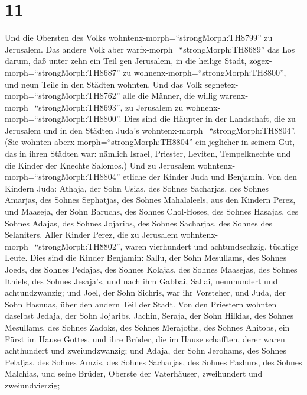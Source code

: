 \hypertarget{section-10}{%
\section{11}\label{section-10}}

 Und die Obersten des Volks
wohntenx-morph=``strongMorph:TH8799'' zu Jerusalem. Das andere Volk aber
warfx-morph=``strongMorph:TH8689'' das Los darum, daß unter zehn ein
Teil gen Jerusalem, in die heilige Stadt,
zögex-morph=``strongMorph:TH8687'' zu
wohnenx-morph=``strongMorph:TH8800'', und neun Teile in den Städten
wohnten.  Und das Volk segnetex-morph=``strongMorph:TH8762''
alle die Männer, die willig warenx-morph=``strongMorph:TH8693'', zu
Jerusalem zu wohnenx-morph=``strongMorph:TH8800''.  Dies
sind die Häupter in der Landschaft, die zu Jerusalem und in den Städten
Juda's wohntenx-morph=``strongMorph:TH8804''. (Sie wohnten
aberx-morph=``strongMorph:TH8804'' ein jeglicher in seinem Gut, das in
ihren Städten war: nämlich Israel, Priester, Leviten, Tempelknechte und
die Kinder der Knechte Salomos.)  Und zu Jerusalem
wohntenx-morph=``strongMorph:TH8804'' etliche der Kinder Juda und
Benjamin. Von den Kindern Juda: Athaja, der Sohn Usias, des Sohnes
Sacharjas, des Sohnes Amarjas, des Sohnes Sephatjas, des Sohnes
Mahalaleels, aus den Kindern Perez,  und Maaseja, der Sohn
Baruchs, des Sohnes Chol-Hoses, des Sohnes Hasajas, des Sohnes Adajas,
des Sohnes Jojaribs, des Sohnes Sacharjas, des Sohnes des Selaniters.
 Aller Kinder Perez, die zu Jerusalem
wohntenx-morph=``strongMorph:TH8802'', waren vierhundert und
achtundsechzig, tüchtige Leute.  Dies sind die Kinder
Benjamin: Sallu, der Sohn Mesullams, des Sohnes Joeds, des Sohnes
Pedajas, des Sohnes Kolajas, des Sohnes Maasejas, des Sohnes Ithiels,
des Sohnes Jesaja's,  und nach ihm Gabbai, Sallai,
neunhundert und achtundzwanzig;  und Joel, der Sohn Sichris,
war ihr Vorsteher, und Juda, der Sohn Hasnuas, über den andern Teil der
Stadt.  Von den Priestern wohnten daselbst Jedaja, der Sohn
Jojaribs, Jachin,  Seraja, der Sohn Hilkias, des Sohnes
Mesullams, des Sohnes Zadoks, des Sohnes Merajoths, des Sohnes Ahitobs,
ein Fürst im Hause Gottes,  und ihre Brüder, die im Hause
schafften, derer waren achthundert und zweiundzwanzig; und Adaja, der
Sohn Jerohams, des Sohnes Pelaljas, des Sohnes Amzis, des Sohnes
Sacharjas, des Sohnes Pashurs, des Sohnes Malchias,  und
seine Brüder, Oberste der Vaterhäuser, zweihundert und zweiundvierzig;

